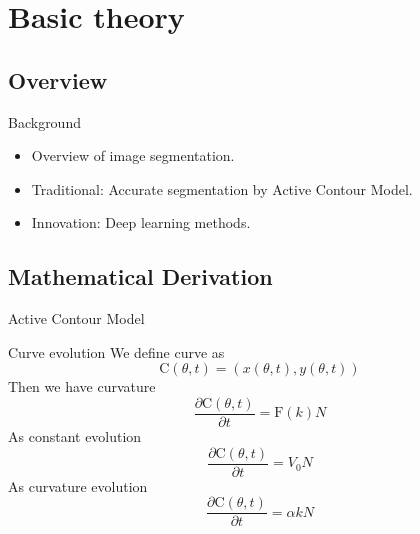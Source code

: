 \section{Basic theory}

\subsection{Overview}
\begin{frame}{Background}
	\begin{itemize}[<+->]
		\item Overview of image segmentation.
		\item Traditional: Accurate segmentation by Active Contour Model.
		\item Innovation: Deep learning methods.
	\end{itemize}
\end{frame}

\subsection{Mathematical Derivation}
\begin{frame}{Active Contour Model}
	\begin{block}{Curve evolution}
		We define curve as
		\begin{equation}
			\mathrm{C}(\theta,t)=(x(\theta,t),y(\theta,t))
		\end{equation}
		Then we have curvature
		\begin{equation}
			\frac{\partial \mathrm{C}(\theta,t)}{\partial t}=\mathrm{F}(k)N
		\end{equation}
		As constant evolution
		\begin{equation}
			\frac{\partial \mathrm{C}(\theta,t)}{\partial t}=V_0 N
		\end{equation}
		As curvature evolution
		\begin{equation}
			\frac{\partial \mathrm{C}(\theta,t)}{\partial t}=\alpha k N
		\end{equation}
	\end{block}
\end{frame}

